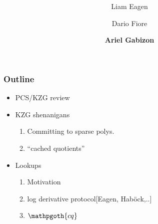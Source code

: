 \documentclass[shadesubsections,compress,14pt,mathserif]{beamer}
\title{ \bf \papertitle \\[0.72cm]}
\author{ Liam Eagen \and Dario Fiore \and \textbf{Ariel Gabizon} }
\newcommand{\cq}{\mathpgoth{cq} }
\begin{document}
\boldmath
\begin{frame}
  \titlepage
\end{frame}


\begin{frame}
  \tableofcontents
\end{frame}
\begin{frame}
\frametitle{Outline}
 
\begin{itemize}
 \item 
PCS/KZG review\pause
\item
KZG shenanigans 
\begin{enumerate}
 \item Committing to sparse polys.
\item ``cached quotients''\pause

\end{enumerate}
\item Lookups
\begin{enumerate}
 \item Motivation
\item log derivative protocol[Eagen, Hab\"ock,..]
\item  $\cq$
\end{enumerate}
\end{itemize}
\end{frame}
\end{document}
